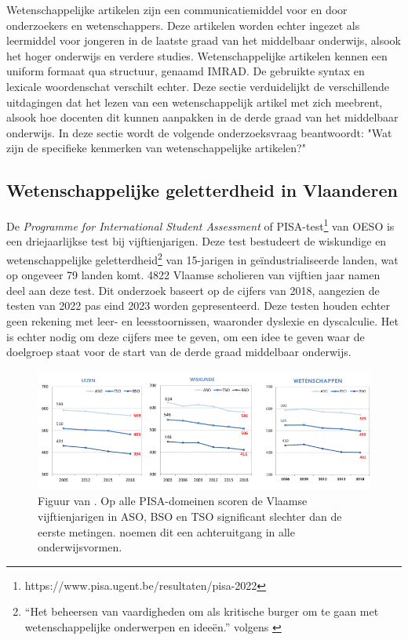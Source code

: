 
Wetenschappelijke artikelen zijn een communicatiemiddel voor en door onderzoekers en wetenschappers. Deze artikelen worden echter ingezet als leermiddel voor jongeren in de laatste graad van het middelbaar onderwijs, alsook het hoger onderwijs en verdere studies. Wetenschappelijke artikelen kennen een uniform formaat qua structuur, genaamd IMRAD. De gebruikte syntax en lexicale woordenschat verschilt echter. Deze sectie verduidelijkt de verschillende uitdagingen dat het lezen van een wetenschappelijk artikel met zich meebrent, alsook hoe docenten dit kunnen aanpakken in de derde graad van het middelbaar onderwijs. In deze sectie wordt de volgende onderzoeksvraag beantwoordt: "Wat zijn de specifieke kenmerken van wetenschappelijke artikelen?"

\subsection{Wetenschappelijke geletterdheid in Vlaanderen}

De \textit{Programme for International Student Assessment} of PISA-test\footnote{https://www.pisa.ugent.be/resultaten/pisa-2022} van OESO is een driejaarlijkse test bij vijftienjarigen. Deze test bestudeert de wiskundige en wetenschappelijke geletterdheid\footnote{“Het beheersen van vaardigheden om als kritische burger om te gaan met wetenschappelijke onderwerpen en ideeën.” volgens \textcite{DeMeyer2019}} van 15-jarigen in geïndustrialiseerde landen, wat op ongeveer 79 landen komt. 4822 Vlaamse scholieren van vijftien jaar namen deel aan deze test. Dit onderzoek baseert op de cijfers van 2018, aangezien de testen van 2022 pas eind 2023 worden gepresenteerd. Deze testen houden echter geen rekening met leer- en leesstoornissen, waaronder dyslexie en dyscalculie. Het is echter nodig om deze cijfers mee te geven, om een idee te geven waar de doelgroep staat voor de start van de derde graad middelbaar onderwijs. 

\begin{figure}[H]
	\begin{center}
		\includegraphics[width=\linewidth]{img/oeso-graphic-pisa-trend-samenvatting.png}
	\end{center}
	\caption{Figuur van \textcite{DeMeyer2019}. Op alle PISA-domeinen scoren de Vlaamse vijftienjarigen in ASO, BSO en TSO significant slechter dan de eerste metingen. \textcite{DeMeyer2019} noemen dit een achteruitgang in alle onderwijsvormen.}
\end{figure}

